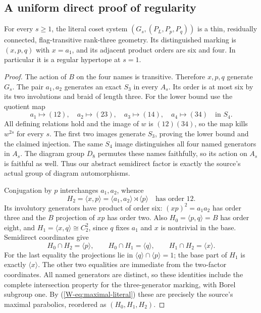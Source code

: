 \subsection{A uniform direct proof of regularity}
\begin{theorem}\label{W-thm:regular}
For every $s\geq1$, the literal coset system
$(G_s,(P_L,P_p,P_q))$ is a thin, residually connected,
flag-transitive rank-three geometry. Its distinguished marking is
$(x,p,q)$ with $x=a_1$, and its adjacent product orders are six
and four. In particular it is a regular hypertope at $s=1$.
\end{theorem}
\begin{proof}
The action of $B$ on the four names is transitive. Therefore $x,p,q$
generate $G_s$. The pair $a_1,a_2$ generates an exact $S_3$ in
every $A_s$. Its order is at most six by its two involutions and
braid of length three. For the lower bound use the quotient map
\[
 a_1\mapsto(12),\quad a_2\mapsto(23),\quad
 a_3\mapsto(14),\quad a_4\mapsto(34)
 \quad\text{in }S_4.
\]
All defining relations hold and the image of $w$ is $(12)(34)$,
so the map kills $w^{2s}$ for every $s$. The first two images
generate $S_3$, proving the lower bound and the claimed injection.
The same $S_4$ image distinguishes all four named generators in $A_s$.
The diagram group $D_8$ permutes these names faithfully, so its action
on $A_s$ is faithful as well. Thus our abstract semidirect factor is
exactly the source's actual group of diagram automorphisms.

Conjugation by $p$ interchanges $a_1,a_2$, whence
\[
 H_2=\langle x,p\rangle=\langle a_1,a_2\rangle\rtimes\langle p\rangle
 \quad\text{has order }12.
\]
Its involutory generators have product of order six:
$(xp)^2=a_1a_2$ has order three and the $B$ projection of $xp$
has order two. Also $H_0=\langle p,q\rangle=B$ has order eight,
and $H_1=\langle x,q\rangle\cong C_2^2$, since $q$ fixes $a_1$
and $x$ is nontrivial in the base. Semidirect coordinates give
\begin{equation}\label{W-eq:intersections}
 H_0\cap H_2=\langle p\rangle,\qquad
 H_0\cap H_1=\langle q\rangle,\qquad
 H_1\cap H_2=\langle x\rangle.
\end{equation}
For the last equality the projections lie in
$\langle q\rangle\cap\langle p\rangle=1$; the base part of
$H_1$ is exactly $\langle x\rangle$. The other two equalities
are immediate from the two-factor coordinates. All named generators
are distinct, so these identities include the complete intersection
property for the three-generator marking, with Borel subgroup one.
By (\ref{W-eq:maximal-literal}) these are precisely the source's maximal
parabolics, reordered as $(H_0,H_1,H_2)$.


\end{proof}
